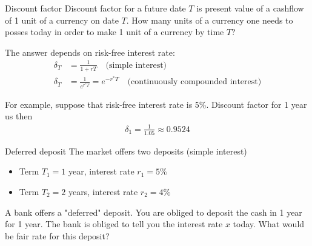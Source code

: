 \documentclass{beamer}
\begin{document}
\begin{frame}{Discount factor}
\justify
\alert{Discount factor} for a future date $T$ is present value of a cashflow of 1 unit of a currency on date $T$. How many units of a currency one needs to posses today in order to make 1 unit of a currency by time $T$?

\justify
The answer depends on risk-free interest rate:
\begin{align*}
\delta_T &= \frac{1}{1 + rT} \quad \text{(simple interest)} \\
\delta_T &= \frac{1}{e^{r^*T}} = e^{-r^*T} \quad \text{(continuously compounded interest)}
\end{align*}

\justify
For example, suppose that risk-free interest rate is 5\%.  Discount factor for 1 year us then
\begin{align*}
\delta_1 = \frac{1}{1.05} \approx 0.9524
\end{align*}
\end{frame}



\begin{frame}{Deferred deposit}
\justify
The market offers two deposits (simple interest)
\begin{itemize}
\item Term $T_1=1$ year, interest rate $r_1=5\%$ 
\item Term $T_2=2$ years, interest rate $r_2=4\%$ 
\end{itemize}

A bank offers a  "deferred" deposit. You are obliged to deposit the cash in 1 year for 1 year. The bank is obliged to tell you the interest rate $x$ today. What would be fair rate for this deposit?

\centering
{}
\end{frame}
\end{document}

